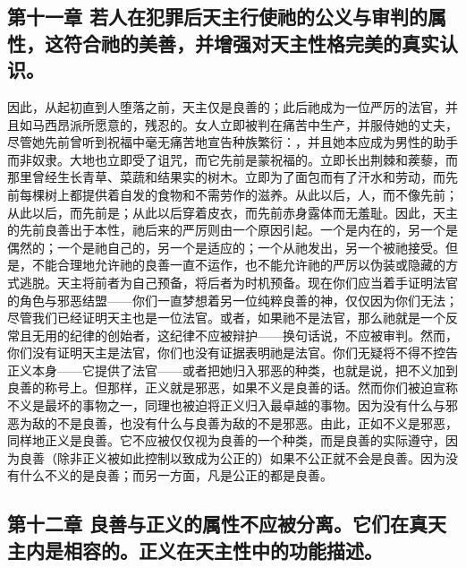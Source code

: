
\subsection{第十一章 若人在犯罪后天主行使祂的公义与审判的属性，这符合祂的美善，并增强对天主性格完美的真实认识。}

因此，从起初直到人堕落之前，天主仅是良善的；此后祂成为一位严厉的法官，并且如马西昂派所愿意的，残忍的。女人立即被判在痛苦中生产，并服侍她的丈夫，尽管她先前曾听到祝福中毫无痛苦地宣告种族繁衍：，并且她本应成为男性的助手而非奴隶。大地也立即受了诅咒，而它先前是蒙祝福的。立即长出荆棘和蒺藜，而那里曾经生长青草、菜蔬和结果实的树木。立即为了面包而有了汗水和劳动，而先前每棵树上都提供着自发的食物和不需劳作的滋养。从此以后，人，而不像先前；从此以后，而先前是；从此以后穿着皮衣，而先前赤身露体而无羞耻。因此，天主的先前良善出于本性，祂后来的严厉则由一个原因引起。一个是内在的，另一个是偶然的；一个是祂自己的，另一个是适应的；一个从祂发出，另一个被祂接受。但是，不能合理地允许祂的良善一直不运作，也不能允许祂的严厉以伪装或隐藏的方式逃脱。天主将前者为自己预备，将后者为时机预备。现在你们应当着手证明法官的角色与邪恶结盟——你们一直梦想着另一位纯粹良善的神，仅仅因为你们无法；尽管我们已经证明天主也是一位法官。或者，如果祂不是法官，那么祂就是一个反常且无用的纪律的创始者，这纪律不应被辩护——换句话说，不应被审判。然而，你们没有证明天主是法官，你们也没有证据表明祂是法官。你们无疑将不得不控告正义本身——它提供了法官——或者把她归入邪恶的种类，也就是说，把不义加到良善的称号上。但那样，正义就是邪恶，如果不义是良善的话。然而你们被迫宣称不义是最坏的事物之一，同理也被迫将正义归入最卓越的事物。因为没有什么与邪恶为敌的不是良善，也没有什么与良善为敌的不是邪恶。由此，正如不义是邪恶，同样地正义是良善。它不应被仅仅视为良善的一个种类，而是良善的实际遵守，因为良善（除非正义被如此控制以致成为公正的）如果不公正就不会是良善。因为没有什么不义的是良善；而另一方面，凡是公正的都是良善。\par


\subsection{第十二章 良善与正义的属性不应被分离。它们在真天主内是相容的。正义在天主性中的功能描述。}

